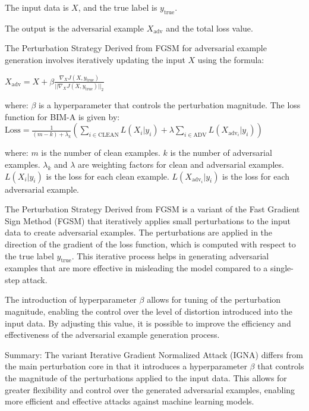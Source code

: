 The input data is $X$, and the true label is $y_{\text{true}}$.

The output is the adversarial example $X_{\text{adv}}$ and the total loss value.

The Perturbation Strategy Derived from FGSM for adversarial example generation involves iteratively updating the input $X$ using the formula:

$X_{\text{adv}} = X + \beta \frac{\nabla_X J(X, y_{\text{true}})} {||\nabla_X J(X, y_{\text{true}})||_2}$

where:
$\beta$ is a hyperparameter that controls the perturbation magnitude.
The loss function for BIM-A is given by:
$\text{Loss} = \frac{1}{{(m - k)} + \lambda_k } \left( \sum_{i \in \text{CLEAN}} L(X_i | y_i) + \lambda \sum_{i \in \text{ADV}} L(X_{\text{adv}_i} | y_i) \right)$

where:
$m$ is the number of clean examples.
$k$ is the number of adversarial examples.
$\lambda_k$ and $\lambda$ are weighting factors for clean and adversarial examples.
$L(X_i | y_i)$ is the loss for each clean example.
$L(X_{\text{adv}_i} | y_i)$ is the loss for each adversarial example.

The Perturbation Strategy Derived from FGSM is a variant of the Fast Gradient Sign Method (FGSM) that iteratively applies small perturbations to the input data to create adversarial examples. The perturbations are applied in the direction of the gradient of the loss function, which is computed with respect to the true label $y_{\text{true}}$. This iterative process helps in generating adversarial examples that are more effective in misleading the model compared to a single-step attack.

The introduction of hyperparameter $\beta$ allows for tuning of the perturbation magnitude, enabling the control over the level of distortion introduced into the input data. By adjusting this value, it is possible to improve the efficiency and effectiveness of the adversarial example generation process.

Summary: The variant Iterative Gradient Normalized Attack (IGNA) differs from the main perturbation core in that it introduces a hyperparameter $\beta$ that controls the magnitude of the perturbations applied to the input data. This allows for greater flexibility and control over the generated adversarial examples, enabling more efficient and effective attacks against machine learning models.